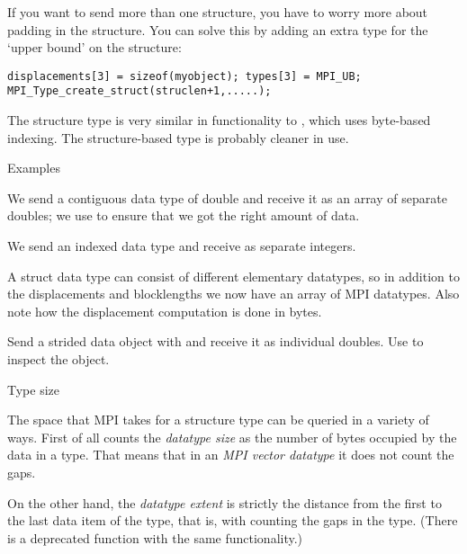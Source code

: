 If you want to send more than one structure, you have to worry more
about padding in the structure. You can solve this by adding an extra
type  for the `upper bound' on the structure:
\begin{verbatim}
displacements[3] = sizeof(myobject); types[3] = MPI_UB;
MPI_Type_create_struct(struclen+1,.....);
\end{verbatim}

The structure type is very similar in functionality to ,
which uses byte-based indexing. The structure-based type is probably cleaner
in use.

 {Examples}


We send a contiguous data type of double and receive it as an array of
separate doubles; we use  to ensure that
we got the right amount of data.
%
%


We send an indexed data type and receive as separate integers.
%
%
%


A struct data type can consist of different elementary datatypes, so
in addition to the displacements and blocklengths we now have an array
of MPI datatypes. Also note how the displacement computation is done
in bytes.
%


Send a strided data object with  and receive it as
individual doubles. Use  to inspect the
 object.
%
%
%

 {Type size}

The space that MPI takes for a structure type can be queried in a
variety of ways. First of all  counts the
\emph{datatype size} as the 
number of bytes occupied by the data in a type. That means that in an
\emph{MPI vector datatype} it does not
count the gaps.
%
%

On the other hand, the \emph{datatype
  extent} is strictly the distance from the
first to the last data item of the type, that is, with counting the
gaps in the type.
%
%
%
(There is a deprecated function  with the same
functionality.)

